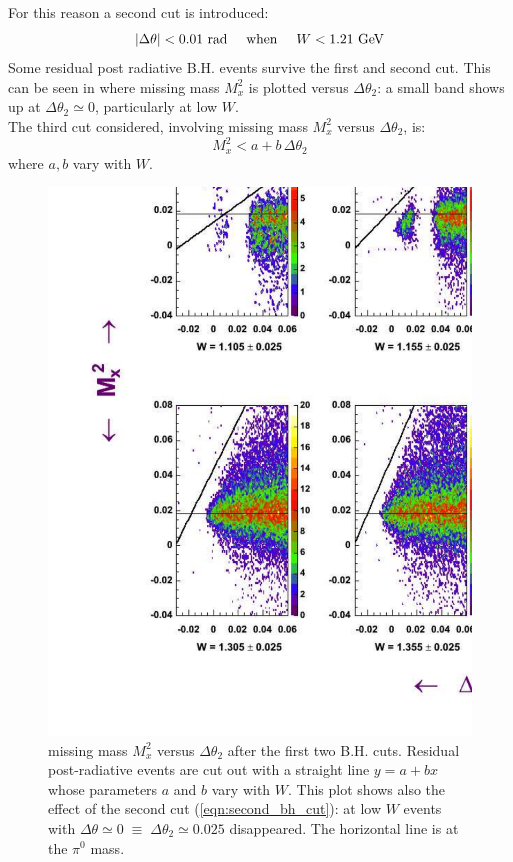 For this reason a second cut is introduced:
\begin{equation}
 \label{eqn:second_bh_cut}
 \left| \Delta\theta \right| < 0.01 \,\,{\rm rad} \;\;\;\;\; {\rm when} \;\;\;\;\; W<1.21\,\,{\rm GeV}
\end{equation}
\cia   
Some residual post radiative B.H. events survive the first and second cut. This can be seen in 
where missing mass $M_x^2$ is plotted versus $\Delta\theta_2$: a small band shows up at $\Delta\theta_2\simeq 0$,
particularly at low $W$.\\
The third cut considered, involving missing mass $M_x^2$ versus $\Delta\theta_2$, is:
$$
 M_x^2 < a+b\,\Delta\theta_2
$$
where $a,b$ vary with $W$. 
\begin{figure}[h]
 \begin{center}
 \includegraphics[width = 15cm, bb=0 40 1300 1000]{data_reduction/img/bh_mm_dthb} 
  \caption[missing mass $M_x^2$ versus $\Delta\theta_2$ after the first two B.H. cuts]
          { missing mass $M_x^2$ versus $\Delta\theta_2$ after the first two B.H. cuts.
                     Residual post-radiative events are cut out with a straight line $y=a+bx$ whose 
		     parameters $a$ and $b$ vary with $W$. This plot shows also the effect of
		     the second cut (\ref{eqn:second_bh_cut}): at low $W$ 
		     events with $\Delta\theta\simeq 0\;\equiv\; \Delta\theta_2\simeq 0.025$ disappeared.
		     The horizontal line is at the $\pi^0$ mass.}
 \label{fig:bh_mm_dthb}
 \end{center}
\end{figure}

